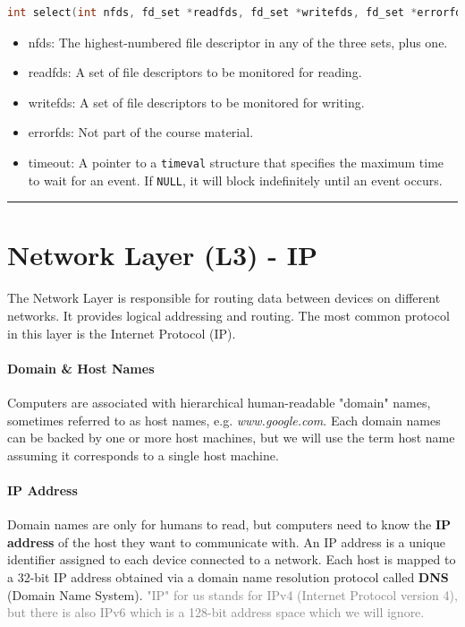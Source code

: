 \documentclass[openany,12pt]{book}
\newcommand{\code}[1]{\texttt{#1}}
\newcommand{\gray}[1]{\textcolor{gray}{#1}}
\begin{document}
\begin{lstlisting}[language=C]
int select(int nfds, fd_set *readfds, fd_set *writefds, fd_set *errorfds, struct timeval *restrict timeout);
\end{lstlisting}

\begin{itemize}
  \item nfds: The highest-numbered file descriptor in any of the three sets, plus one.
  \item readfds: A set of file descriptors to be monitored for reading.
  \item writefds: A set of file descriptors to be monitored for writing.
  \item errorfds: Not part of the course material.
  \item timeout: A pointer to a \code{timeval} structure that specifies the maximum time to wait for an event. If \code{NULL}, it will block indefinitely until an event occurs.
\end{itemize}






\noindent\rule{\linewidth}{0.5pt}



\section*{Network Layer (L3) - IP}

The Network Layer is responsible for routing data between devices on different networks. It provides logical addressing and routing. The most common protocol in this layer is the Internet Protocol (IP).

\paragraph{Domain \& Host Names} Computers are associated with hierarchical human-readable "domain" names, sometimes referred to as host names, e.g. \textit{www.google.com}. Each domain names can be backed by one or more host machines, but we will use the term host name assuming it corresponds to a single host machine.


\paragraph{IP Address} Domain names are only for humans to read, but computers need to know the \textbf{IP address} of the host they want to communicate with. An IP address is a unique identifier assigned to each device connected to a network. Each host is mapped to a 32-bit IP address obtained via a domain name resolution protocol called \textbf{DNS} (Domain Name System). \gray{"IP" for us stands for IPv4 (Internet Protocol version 4), but there is also IPv6 which is a 128-bit address space which we will ignore.}
\end{document}
